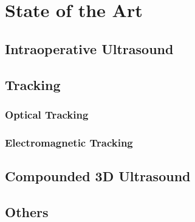 \chapter{State of the Art}

\section{Intraoperative Ultrasound}
\section{Tracking}
\subsection{Optical Tracking}
\subsection{Electromagnetic Tracking}
\section{Compounded 3D Ultrasound}
\section{Others}

\endinput